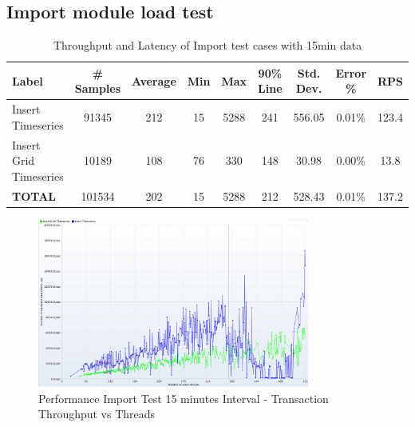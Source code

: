\subsection{Import module load test}
\label{subse:obs_test_plan_import_15min}

\begin{table}[ht]
\caption{Throughput and Latency of Import test cases with 15min data}
\footnotesize
\begin{tabulary}{\linewidth}{|L|C|C|C|C|C|C|C|C|}
\hline
Label & \# Samples & Average & Min & Max & 90\% Line & Std. Dev. & Error \% & RPS \\ \hline
Insert Timeseries & 91345 & 212 & 15 & 5288 & 241 & 556.05 & 0.01\% & 123.4 \\ \hline
Insert Grid Timeseries & 10189 & 108 & 76 & 330 & 148 & 30.98 & 0.00\% & 13.8 \\ \hline
\textbf{TOTAL} & 101534 & 202 & 15 & 5288 & 212 & 528.43 & 0.01\% & 137.2 \\ \hline
\end{tabulary}
\label{tab:obs_import_15_min_summary}
\end{table}


\begin{figure}[htp]
    \centering
    \includegraphics[width=0.8\textwidth]{results/obs/import/obs_import_15m_transaction_throughtput_vs_threads.png}
    \caption{Performance Import Test 15 minutes Interval - Transaction Throughput vs Threads}
    \label{fi:test_obs_import_15m_throughtput}
\end{figure}

